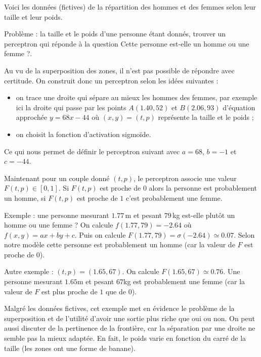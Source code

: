 \documentclass[11pt,class=report,crop=false]{standalone}
\begin{document}
\begin{exemple}
Voici les données (fictives) de la répartition des hommes et des femmes selon leur taille et leur poids.
  


Problème : la taille et le poids d'une personne étant donnés, trouver un perceptron qui réponde à la question \og{}Cette personne est-elle un homme ou une femme ?\fg{}.

Au vu de la superposition des zones, il n'est pas possible de répondre avec certitude.  On construit donc un perceptron selon les idées suivantes :
\begin{itemize}
  \item on trace une droite qui sépare au mieux les hommes des femmes, par exemple ici la droite qui passe par les points $A(1.40,52)$ et $B(2.06,93)$ d'équation approchée $y=68x-44$ où $(x,y)=(t,p)$ représente la taille et le poids ;

  \item on choisit la fonction d'activation sigmoïde.
\end{itemize}
Ce qui nous permet de définir le perceptron suivant avec $a=68$, $b=-1$ et $c=-44$.

\begin{center}
\begin{minipage}{0.35\textwidth}
\end{minipage}
\begin{minipage}{0.45\textwidth}
\end{minipage}
\end{center}

Maintenant pour un couple donné $(t,p)$, le perceptron associe une valeur $F(t,p) \in [0,1]$.
Si $F(t,p)$ est proche de $0$ alors la personne est probablement un homme, si $F(t,p)$ est proche de $1$ c'est probablement une femme.


Exemple : une personne mesurant $1.77$\,m et pesant $79$\,kg est-elle plutôt un homme ou une femme ? On calcule $f(1.77,79)=-2.64$ où $f(x,y)=ax+by+c$.
Puis on calcule $F(1.77,79) = \sigma(-2.64) \simeq 0.07$. Selon notre modèle cette personne est probablement un homme (car la valeur de $F$ est proche de $0$).

Autre exemple : $(t,p)=(1.65,67)$. On calcule $F(1.65,67) \simeq 0.76$.
Une personne mesurant $1.65$m et pesant $67$kg est probablement une femme (car la valeur de $F$ est plus proche de $1$ que de $0$).

Malgré les données fictives, cet exemple met en évidence le problème de la superposition et de l'utilité d'avoir une sortie plus riche que  \og{}oui\fg{} ou \og{}non\fg{}. On peut aussi discuter de la pertinence de la frontière, car la séparation par une droite ne semble pas la mieux adaptée.  En fait, le poids varie en fonction du carré de la taille (les zones ont une forme de banane). 
\end{exemple}
\end{document}

